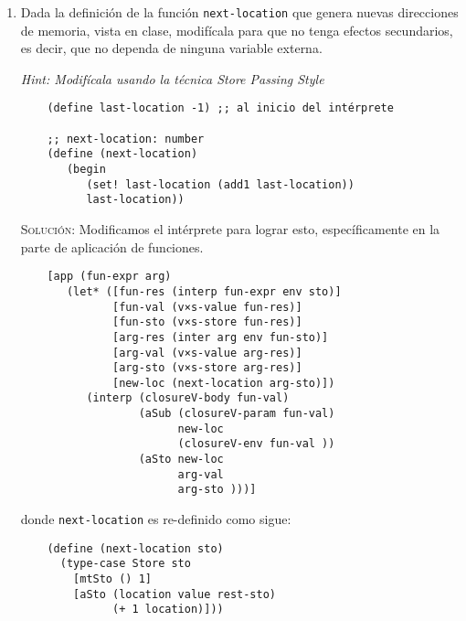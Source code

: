 \documentclass[letterpaper,11pt]{article}
\begin{document}
\begin{enumerate}
    \item Dada la definición de la función \texttt{next-location} que genera 
    nuevas direcciones de memoria, vista en clase, modifícala para que no 
    tenga efectos secundarios, es decir, que no dependa de ninguna variable
    externa. 
    
    \textit{Hint: Modifícala usando la técnica Store Passing Style}
    \begin{verbatim}
    (define last-location -1) ;; al inicio del intérprete

    ;; next-location: number
    (define (next-location)
       (begin 
          (set! last-location (add1 last-location))
          last-location))
    \end{verbatim}

    \textsc{Solución:} Modificamos el intérprete para lograr esto, 
    específicamente en la parte de aplicación de funciones.
    \begin{verbatim}
    [app (fun-expr arg)
       (let* ([fun-res (interp fun-expr env sto)]
              [fun-val (v×s-value fun-res)]
              [fun-sto (v×s-store fun-res)]
              [arg-res (inter arg env fun-sto)]
              [arg-val (v×s-value arg-res)]
              [arg-sto (v×s-store arg-res)]
              [new-loc (next-location arg-sto)])
          (interp (closureV-body fun-val)
                  (aSub (closureV-param fun-val)
                        new-loc
                        (closureV-env fun-val ))
                  (aSto new-loc
                        arg-val
                        arg-sto )))]
    \end{verbatim}
    
    \newpage
    donde \texttt{next-location} es re-definido como sigue:
    \begin{verbatim}
    (define (next-location sto)
      (type-case Store sto
        [mtSto () 1]
        [aSto (location value rest-sto)
              (+ 1 location)]))
    \end{verbatim}
\end{enumerate}
\end{document}
